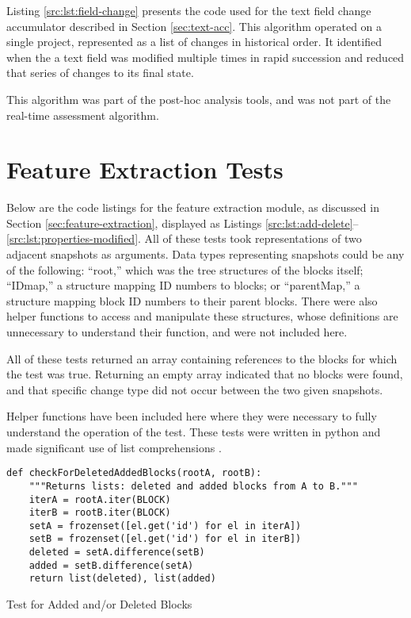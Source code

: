 Listing \ref{src:lst:field-change} presents the code used for the text field change accumulator described in Section \ref{sec:text-acc}. This algorithm operated on a single project, represented as a list of changes in historical order. It identified when the a text field was modified multiple times in rapid succession and reduced that series of changes to its final state.

This algorithm was part of the post-hoc analysis tools, and was not part of the real-time assessment algorithm.


\section{Feature Extraction Tests}
\label{src:feature-extraction-tests}

Below are the code listings for the feature extraction module, as discussed in Section \ref{sec:feature-extraction}, displayed as Listings \ref{src:lst:add-delete}--\ref{src:lst:properties-modified}. All of these tests took representations of two adjacent snapshots as arguments. Data types representing snapshots could be any of the following: ``root,'' which was the tree structures of the blocks itself; ``IDmap,'' a structure mapping ID numbers to blocks; or ``parentMap,'' a structure mapping block ID numbers to their parent blocks. There were also helper functions to access and manipulate these structures, whose definitions are unnecessary to understand their function, and were not included here.

All of these tests returned an array containing references to the blocks for which the test was true. Returning an empty array indicated that no blocks were found, and that specific change type did not occur between the two given snapshots.

Helper functions have been included here where they were necessary to fully understand the operation of the test. These tests were written in python and made significant use of list comprehensions \citep{oliphant2007python}.

\begin{listing}[]
\begin{verbatim}
def checkForDeletedAddedBlocks(rootA, rootB):
    """Returns lists: deleted and added blocks from A to B."""
    iterA = rootA.iter(BLOCK)
    iterB = rootB.iter(BLOCK)
    setA = frozenset([el.get('id') for el in iterA])
    setB = frozenset([el.get('id') for el in iterB])
    deleted = setA.difference(setB)
    added = setB.difference(setA)
    return list(deleted), list(added)
\end{verbatim}
\caption{Test for Added and/or Deleted Blocks}
\label{src:lst:add-delete}
\end{listing}

